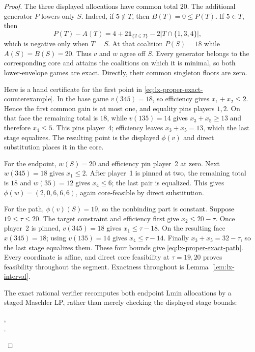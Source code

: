 \begin{proof}
The three displayed allocations have common total $20$.  The additional
generator $P$ lowers only $S$.  Indeed, if $5\notin T$, then
$B(T)=0\leq P(T)$.  If $5\in T$, then
\[
 P(T)-A(T)=4+2\mathbf1_{\{2\in T\}}
       -2|T\cap\{1,3,4\}|,
\]
which is negative only when $T=S$.  At that coalition $P(S)=18$ while
$A(S)=B(S)=20$.  Thus $v$ and $w$ agree off $S$.  Every generator belongs
to the corresponding core and attains the coalitions on which it is minimal,
so both lower-envelope games are exact.  Directly, their common singleton
floors are zero.

Here is a hand certificate for the first point in
\eqref{eq:lx-proper-exact-counterexample}.  In the base game
$v(345)=18$, so efficiency gives $x_1+x_2\leq2$.  Hence the first common
gain is at most one, and equality pins players $1,2$.  On that face the
remaining total is $18$, while $v(135)=14$ gives
$x_3+x_5\geq13$ and therefore $x_4\leq5$.  This pins player~4; efficiency
leaves $x_3+x_5=13$, which the last stage equalizes.  The resulting point is
the displayed $\phi(v)$ and direct substitution places it in the core.

For the endpoint, $w(S)=20$ and efficiency pin player~2 at zero.  Next
$w(345)=18$ gives $x_1\leq2$.  After player~1 is pinned at two, the remaining
total is $18$ and $w(35)=12$ gives $x_4\leq6$; the last pair is equalized.
This gives $\phi(w)=(2,0,6,6,6)$, again core-feasible by direct substitution.

For the path, $\phi(v)(S)=19$, so the nonbinding part is constant.  Suppose
$19\leq\tau\leq20$.  The target constraint and efficiency first give
$x_2\leq20-\tau$.  Once player~2 is pinned, $v(345)=18$ gives
$x_1\leq\tau-18$.  On the resulting face $x(345)=18$; using
$v(135)=14$ gives $x_4\leq\tau-14$.  Finally
$x_3+x_5=32-\tau$, so the last stage equalizes them.  These four bounds give
\eqref{eq:lx-proper-exact-path}.  Every coordinate is affine, and direct
core feasibility at $\tau=19,20$ proves feasibility throughout the segment.
Exactness throughout is Lemma~\ref{lem:lx-interval}.

The exact rational verifier recomputes both endpoint Lmin allocations by a
staged Maschler LP, rather than merely checking the displayed stage bounds:
\begin{center}
\small{},\\[-2pt]
\small{}.
\end{center}
\end{proof}

